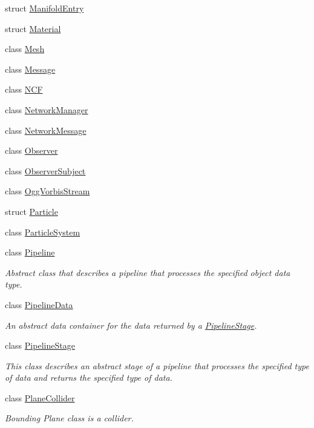 \begin{DoxyCompactItemize}
struct \hyperlink{struct_blade_1_1_manifold_entry}{Manifold\+Entry}
\item 
struct \hyperlink{struct_blade_1_1_material}{Material}
\item 
class \hyperlink{class_blade_1_1_mesh}{Mesh}
\item 
class \hyperlink{class_blade_1_1_message}{Message}
\item 
class \hyperlink{class_blade_1_1_n_c_f}{N\+CF}
\item 
class \hyperlink{class_blade_1_1_network_manager}{Network\+Manager}
\item 
class \hyperlink{class_blade_1_1_network_message}{Network\+Message}
\item 
class \hyperlink{class_blade_1_1_observer}{Observer}
\item 
class \hyperlink{class_blade_1_1_observer_subject}{Observer\+Subject}
\item 
class \hyperlink{class_blade_1_1_ogg_vorbis_stream}{Ogg\+Vorbis\+Stream}
\item 
struct \hyperlink{struct_blade_1_1_particle}{Particle}
\item 
class \hyperlink{class_blade_1_1_particle_system}{Particle\+System}
\item 
class \hyperlink{class_blade_1_1_pipeline}{Pipeline}
\begin{DoxyCompactList}\small\item\em Abstract class that describes a pipeline that processes the specified object data type. \end{DoxyCompactList}\item 
class \hyperlink{class_blade_1_1_pipeline_data}{Pipeline\+Data}
\begin{DoxyCompactList}\small\item\em An abstract data container for the data returned by a \hyperlink{class_blade_1_1_pipeline_stage}{Pipeline\+Stage}. \end{DoxyCompactList}\item 
class \hyperlink{class_blade_1_1_pipeline_stage}{Pipeline\+Stage}
\begin{DoxyCompactList}\small\item\em This class describes an abstract stage of a pipeline that processes the specified type of data and returns the specified type of data. \end{DoxyCompactList}\item 
class \hyperlink{class_blade_1_1_plane_collider}{Plane\+Collider}
\begin{DoxyCompactList}\small\item\em Bounding Plane class is a collider. \end{DoxyCompactList}\item 

\end{DoxyCompactItemize}
